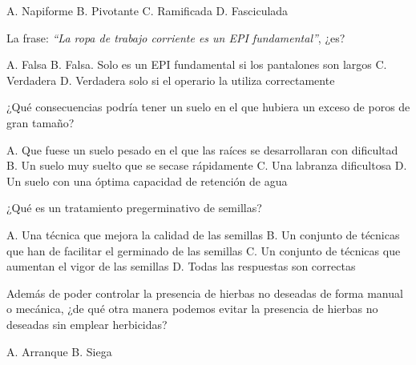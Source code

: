\documentclass[11pt]{exam}
\begin{document}
{\begin{questions}
\begin{figure}[h!]
  \end{figure}
  \begin{checkboxes}
    \choice A. Napiforme
    \choice B. Pivotante
    \choice C. Ramificada
    \CorrectChoice D. Fasciculada
  \end{checkboxes}
  \newpage
\question La frase: \emph{``La ropa de trabajo corriente es un EPI fundamental''}, ¿es?
  \begin{checkboxes}
    \CorrectChoice A. Falsa
    \choice B. Falsa. Solo es un EPI fundamental si los pantalones son largos
    \choice C. Verdadera
    \choice D. Verdadera solo si el operario la utiliza correctamente
  \end{checkboxes}
 
  \question ¿Qué consecuencias podría tener un suelo en el que hubiera un exceso
  de poros de gran tamaño?
  \begin{checkboxes}
    \choice A. Que fuese un suelo pesado en el que las raíces se desarrollaran
    con dificultad
    \CorrectChoice B. Un suelo muy suelto que se secase rápidamente
    \choice C. Una labranza dificultosa
    \choice D. Un suelo con una óptima capacidad de retención de agua
  \end{checkboxes}
\question ¿Qué es un tratamiento pregerminativo de semillas?
  \begin{checkboxes}
    \choice A. Una técnica que mejora la calidad de las semillas
    \CorrectChoice B. Un conjunto de técnicas que han de facilitar el germinado de las
    semillas
    \choice C. Un conjunto de técnicas que aumentan el vigor de las semillas
    \choice D. Todas las respuestas son correctas
  \end{checkboxes}
  \newpage
\question Además de poder controlar la presencia de hierbas no deseadas de forma manual o
  mecánica, ¿de qué otra manera podemos evitar la presencia de hierbas no deseadas sin
  emplear herbicidas?
  \begin{checkboxes}
    \choice A. Arranque
    \choice B. Siega

\end{checkboxes}
\end{questions}}
\end{document}
